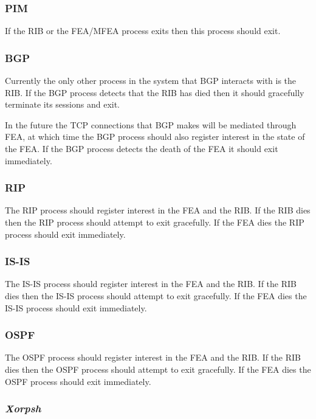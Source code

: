 \documentclass[11pt]{article}
\makeatletter
\newcommand{\xorpsh} {{\em Xorpsh}\@\xspace}
\makeatother
\begin{document}
\subsubsection{PIM}

If the RIB or the FEA/MFEA process exits then this process should exit.

\subsubsection{BGP}

Currently the only other process in the system that BGP interacts
with is the RIB. If the BGP process detects that the RIB has died then
it should gracefully terminate its sessions and exit.

In the future the TCP connections that BGP makes will be mediated
through FEA, at which time the BGP process should also register
interest in the state of the FEA. If the BGP process detects the death
of the FEA it should exit immediately.

\subsubsection{RIP}

The RIP process should register interest in the FEA and the RIB. If
the RIB dies then the RIP process should attempt to exit gracefully.
If the FEA dies the RIP process should exit immediately.

\subsubsection{IS-IS}

The IS-IS process should register interest in the FEA and the RIB. If
the RIB dies then the IS-IS process should attempt to exit gracefully.
If the FEA dies the IS-IS process should exit immediately.

\subsubsection{OSPF}

The OSPF process should register interest in the FEA and the RIB. If
the RIB dies then the OSPF process should attempt to exit gracefully.
If the FEA dies the OSPF process should exit immediately.

\subsubsection{\label{xorpsh}\xorpsh}
\end{document}
